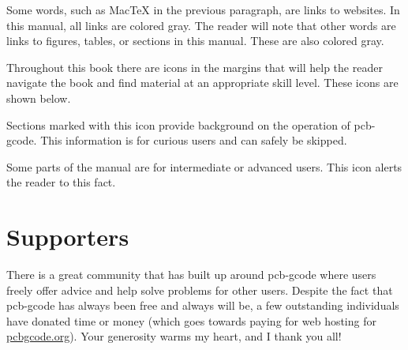\documentclass[11pt]{book}
\begin{document}
\noindent Some words, such as MacTeX in the previous paragraph, are links to websites. In this manual, all links are colored gray. The reader will note that other words are links to figures, tables, or sections in this manual. These are also colored gray.
\vspace{1ex}

\noindent Throughout this book there are icons in the margins that will help the reader navigate the book and find material at an appropriate skill level. These icons are shown below.
\vspace{1ex}

\howitworks{} \noindent Sections marked with this icon provide background on the operation of pcb-gcode. This information is for curious users and can safely be skipped.
\vspace{7ex}


\warning{} \noindent Some parts of the manual are for intermediate or advanced users. This icon alerts the reader to this fact.

\vspace{2ex}

\newpage

\section*{Supporters}

\noindent There is a great community that has built up around pcb-gcode where users freely offer advice and help solve problems for other users. Despite the fact that pcb-gcode has always been free and always will be, a few outstanding individuals have donated time or money (which goes towards paying for web hosting for \url{pcbgcode.org}). Your generosity warms my heart, and I thank you all!
\end{document}
